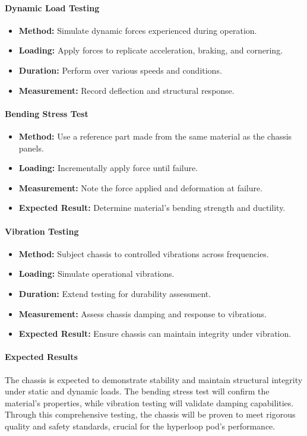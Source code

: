 \paragraph{Dynamic Load Testing}
\begin{itemize}
    \item \textbf{Method:} Simulate dynamic forces experienced during operation.
    \item \textbf{Loading:} Apply forces to replicate acceleration, braking, and cornering.
    \item \textbf{Duration:} Perform over various speeds and conditions.
    \item \textbf{Measurement:} Record deflection and structural response.
\end{itemize}

\paragraph{Bending Stress Test}
\begin{itemize}
    \item \textbf{Method:} Use a reference part made from the same material as the chassis panels.
    \item \textbf{Loading:} Incrementally apply force until failure.
    \item \textbf{Measurement:} Note the force applied and deformation at failure.
    \item \textbf{Expected Result:} Determine material's bending strength and ductility.
\end{itemize}

\paragraph{Vibration Testing}
\begin{itemize}
    \item \textbf{Method:} Subject chassis to controlled vibrations across frequencies.
    \item \textbf{Loading:} Simulate operational vibrations.
    \item \textbf{Duration:} Extend testing for durability assessment.
    \item \textbf{Measurement:} Assess chassis damping and response to vibrations.
    \item \textbf{Expected Result:} Ensure chassis can maintain integrity under vibration.
\end{itemize}

\paragraph{Expected Results}
The chassis is expected to demonstrate stability and maintain structural integrity under static and dynamic loads. The bending stress test will confirm the material's properties, while vibration testing will validate damping capabilities. Through this comprehensive testing, the chassis will be proven to meet rigorous quality and safety standards, crucial for the hyperloop pod's performance.
